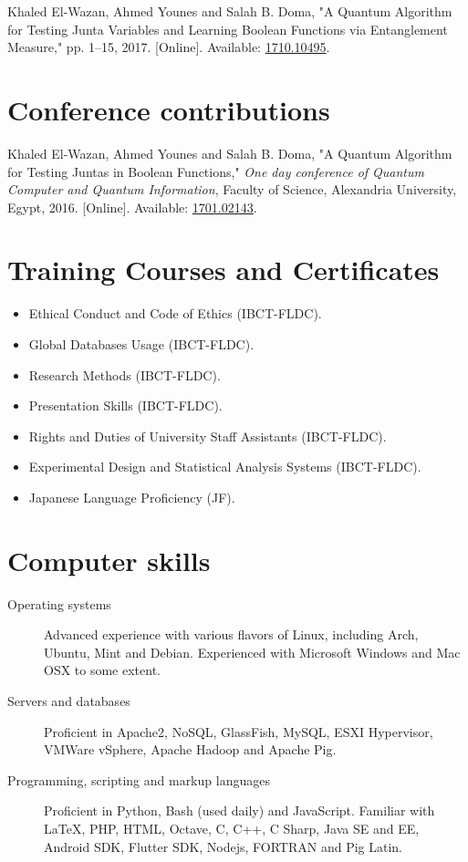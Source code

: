 \documentclass[margin,line]{resume}
\begin{document}
\begin{resume}
	Khaled El-Wazan, Ahmed Younes and Salah B. Doma, "A Quantum Algorithm for Testing Junta Variables and Learning Boolean Functions via Entanglement Measure,"  pp. 1--15, 2017.
		[Online]. Available: \href{http://arxiv.org/abs/1710.10495}{1710.10495}.



	\section{ \mysidestyle Conference contributions}


	Khaled El-Wazan, Ahmed Younes and Salah B. Doma, "A Quantum Algorithm for Testing Juntas in Boolean Functions," \textit{One day conference of Quantum Computer and Quantum Information}, Faculty of Science, Alexandria University, Egypt, 2016. [Online]. Available: \href{http://arxiv.org/abs/1701.02143}{1701.02143}.


	\section{\mysidestyle Training Courses and Certificates}
	\begin{itemize}

		\item Ethical Conduct and Code of Ethics (IBCT-FLDC).
		\item Global Databases Usage (IBCT-FLDC).
		\item Research Methods (IBCT-FLDC).
		\item Presentation Skills (IBCT-FLDC).
		\item Rights and Duties of University Staff Assistants (IBCT-FLDC).
		\item Experimental Design and Statistical Analysis Systems (IBCT-FLDC).
		\item Japanese Language Proficiency (JF).

	\end{itemize}




	\section{\mysidestyle Computer skills}\vspace{1mm}
	\begin{description}
		\item[Operating systems] Advanced experience with various flavors of Linux, including Arch, Ubuntu, Mint and Debian. Experienced with Microsoft Windows and Mac OSX to some extent.
		\item[Servers and databases] Proficient in Apache2, NoSQL, GlassFish, MySQL, ESXI Hypervisor, VMWare vSphere, Apache Hadoop and Apache Pig.
		\item[Programming, scripting and markup languages] Proficient in Python, Bash (used daily) and JavaScript. Familiar with \LaTeX, PHP, HTML, Octave, C, C++, C Sharp, Java SE and EE, Android SDK, Flutter SDK, Nodejs, FORTRAN and Pig Latin.
	\end{description}



\end{resume}
\end{document}
